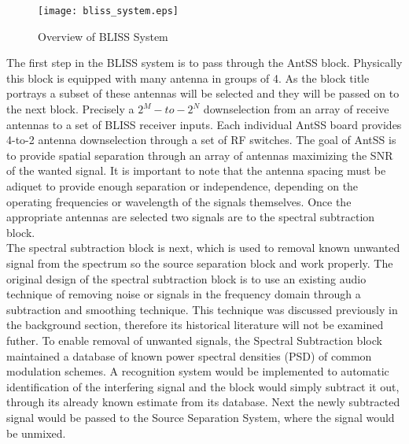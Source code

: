 \begin{figure}[!ht]\label{bliss_system}
\centering
\texttt{[image: bliss\_system.eps]}
\caption{Overview of BLISS System }
\end{figure}

The first step in the BLISS system is to pass through the AntSS block.  Physically this block is equipped with many antenna in groups of 4.  As the block title portrays a subset of these antennas will be selected and they will be passed on to the next block.  Precisely a \(2^{M}-to-2^{N}\) downselection from an array of receive antennas to a set of BLISS receiver inputs. Each individual AntSS board provides 4-to-2 antenna downselection through a set of RF switches.  The goal of AntSS is to provide spatial separation through an array of antennas maximizing the SNR of the wanted signal.  It is important to note that the antenna spacing must be adiquet to provide enough separation or independence, depending on the operating frequencies or wavelength of the signals themselves.  Once the appropriate antennas are selected two signals are to the spectral subtraction block.\\

The spectral subtraction block is next, which is used to removal known unwanted signal from the spectrum so the source separation block and work properly.  The original design of the spectral subtraction block is to use an existing audio technique of removing noise or signals in the frequency domain through a subtraction and smoothing technique.  This technique was discussed previously in the background section, therefore its historical literature will not be examined futher.  To enable removal of unwanted signals, the Spectral Subtraction block maintained a database of known power spectral densities (PSD) of common modulation schemes.  A recognition system would be implemented to automatic identification of the interfering signal and the block would simply subtract it out, through its already known estimate from its database.  Next the newly subtracted signal would be passed to the Source Separation System, where the signal would be unmixed.\\

